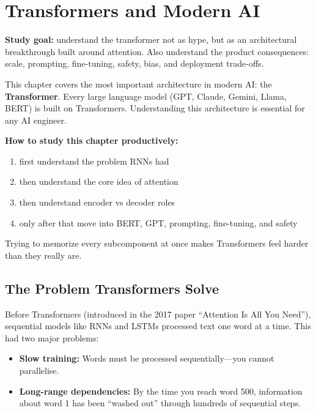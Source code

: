 \documentclass[12pt, a4paper, oneside]{book}
\begin{document}


\chapter{Transformers and Modern AI}

\begin{studybox}
\textbf{Study goal:} understand the transformer not as hype, but as an architectural breakthrough built around attention. Also understand the product consequences: scale, prompting, fine-tuning, safety, bias, and deployment trade-offs.
\end{studybox}

This chapter covers the most important architecture in modern AI: the \textbf{Transformer}. Every large language model (GPT, Claude, Gemini, Llama, BERT) is built on Transformers. Understanding this architecture is essential for any AI engineer.

\begin{notebox}
\textbf{How to study this chapter productively:}
\begin{enumerate}[leftmargin=2em]
    \item first understand the problem RNNs had
    \item then understand the core idea of attention
    \item then understand encoder vs decoder roles
    \item only after that move into BERT, GPT, prompting, fine-tuning, and safety
\end{enumerate}
Trying to memorize every subcomponent at once makes Transformers feel harder than they really are.
\end{notebox}

\section{The Problem Transformers Solve}

Before Transformers (introduced in the 2017 paper ``Attention Is All You Need''), sequential models like RNNs and LSTMs processed text one word at a time. This had two major problems:

\begin{itemize}[leftmargin=2em]
    \item \textbf{Slow training:} Words must be processed sequentially---you cannot parallelise.
    \item \textbf{Long-range dependencies:} By the time you reach word 500, information about word 1 has been ``washed out'' through hundreds of sequential steps.
\end{itemize}
\end{document}
